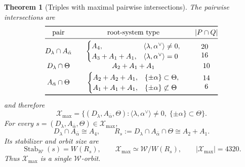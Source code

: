 \documentclass[11pt]{article}
\newtheorem{theorem}{Theorem}[section]
\theoremstyle{remark}
\begin{document}
\begin{theorem}[Triples with maximal pairwise intersections]
\label{thm:incidence}
The pairwise intersections are
\[
\begin{array}{@{}c@{\qquad}c@{\qquad}c@{}}
\toprule
\text{pair}&\text{root-system type}&\lvert P\cap Q\rvert\\
\midrule
D_\lambda\cap A_{\bar\alpha}&
\begin{cases}
A_4,&\langle\lambda,\alpha^\vee\rangle\ne0,\\
A_3+A_1+A_1,&\langle\lambda,\alpha^\vee\rangle=0
\end{cases}
&\begin{matrix}20\\16\end{matrix}\\[8pt]
D_\lambda\cap\Theta&A_2+A_1+A_1&10\\[2pt]
A_{\bar\alpha}\cap\Theta&
\begin{cases}
A_2+A_2+A_1,&\{\pm\alpha\}\subset\Theta,\\
A_1+A_1+A_1,&\{\pm\alpha\}\not\subset\Theta
\end{cases}
&\begin{matrix}14\\6\end{matrix}\\
\bottomrule
\end{array}
\]
and therefore
\[
 \mathcal X_{\max}
 =\{(D_\lambda,A_{\bar\alpha},\Theta):
    \langle\lambda,\alpha^\vee\rangle\ne0,\;
    \{\pm\alpha\}\subset\Theta\}.
\]
For every \(s=(D_\lambda,A_{\bar\alpha},\Theta)\in\mathcal X_{\max}\),
\[
 D_\lambda\cap A_{\bar\alpha}\cong A_4,\qquad
 R_s:=D_\lambda\cap A_{\bar\alpha}\cap\Theta\cong A_2+A_1.
\]
Its stabilizer and orbit size are
\[
 \operatorname{Stab}_{\mathcal W}(s)=W(R_s),\qquad
 \mathcal X_{\max}\simeq\mathcal W/W(R_s),
 \qquad \lvert\mathcal X_{\max}\rvert=4320.
\]
Thus \(\mathcal X_{\max}\) is a single \(\mathcal W\)-orbit.
\end{theorem}
\end{document}
